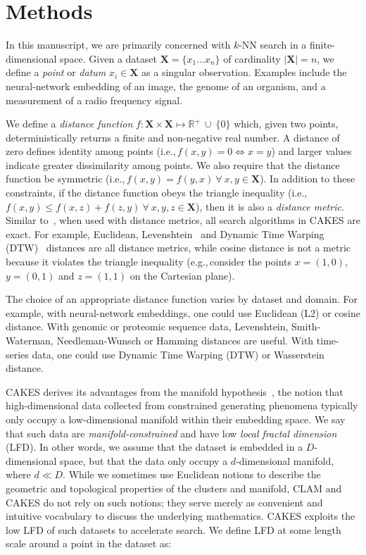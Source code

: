 \section{Methods}
\label{sec:methods}

In this manuscript, we are primarily concerned with $k$-NN search in a finite-dimensional space.
Given a dataset $\textbf{X} = \{x_1 \dots x_n\}$ of cardinality $|\textbf{X}| = n$, we define a \textit{point} or \textit{datum} $x_i \in \textbf{X}$ as a singular observation. Examples include the neural-network embedding of an image, the genome of an organism, and a measurement of a radio frequency signal.

We define a \textit{distance function} $f : \textbf{X} \times \textbf{X} \mapsto \mathbb{R}^+ \ \cup \ \{0\}$ which, given two points, deterministically returns a finite and non-negative real number.
A distance of zero defines identity among points (i.e.,\,$f(x, y) = 0 \Leftrightarrow x = y$) and larger values indicate greater dissimilarity among points.
We also require that the distance function be symmetric (i.e.,\,$f(x, y) = f(y, x) \ \forall \ x, y \in \textbf{X}$).
In addition to these constraints, if the distance function obeys the triangle inequality (i.e.,\,$f(x, y) \leq f(x, z) + f(z, y) \ \forall \ x, y, z \in \textbf{X}$), then it is also a \textit{distance metric}.
Similar to~\cite{yu2015entropy}, when used with distance metrics, all search algorithms in CAKES are exact.
For example, Euclidean, Levenshtein~\cite{levenshtein1966binary} and Dynamic Time Warping (DTW)~\cite{muller2007dynamic} distances are all distance metrics, while cosine distance is not a metric because it violates the triangle inequality (e.g.,\,consider the points $x = (1, 0)$, $y = (0, 1)$ and $z = (1, 1)$ on the Cartesian plane).

The choice of an appropriate distance function varies by dataset and domain.
For example, with neural-network embeddings, one could use Euclidean (L2) or cosine distance.
With genomic or proteomic sequence data, Levenshtein, Smith-Waterman, Needleman-Wunsch or Hamming distances are useful.
With time-series data, one could use Dynamic Time Warping (DTW) or Wasserstein distance.

CAKES derives its advantages from the manifold hypothesis~\cite{fefferman2016testing}, the notion that high-dimensional data collected from constrained generating phenomena typically only occupy a low-dimensional manifold within their embedding space.
We say that such data are \textit{manifold-constrained} and have low \textit{local fractal dimension} (LFD).
In other words, we assume that the dataset is embedded in a $D$-dimensional space, but that the data only occupy a $d$-dimensional manifold, where $d \ll D$.
While we sometimes use Euclidean notions to describe the geometric and topological properties of the clusters and manifold, CLAM and CAKES do not rely on such notions;
they serve merely as convenient and intuitive vocabulary to discuss the underlying mathematics.
CAKES exploits the low LFD of such datasets to accelerate search.
We define LFD at some length scale around a point in the dataset as:

